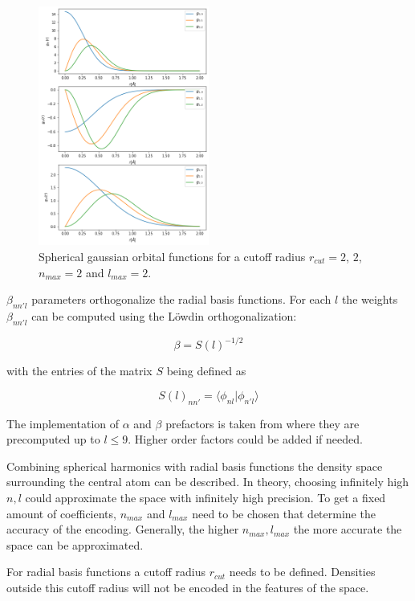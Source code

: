 \begin{figure} [hb!]
  \centering
  \includegraphics[width=0.5\textwidth]{figures/snap/gaus_orb.png} %
  \caption[Radial basis functions]{Spherical gaussian orbital functions for a cutoff radius $r_{cut}=2$, $2$, $n_{max}=2$ and $l_{max}=2$. }
  \label{fig:gaussians}
\end{figure}

$\beta_{nn'l}$ parameters orthogonalize the radial basis functions.
For each $l$ the weights $\beta_{nn'l}$ can be computed using the Löwdin orthogonalization:

$$\beta = S(l)^{-1/2} $$

with the entries of the matrix $S$ being defined as

$$S(l)_{nn'} = \langle \phi_{nl} | \phi_{n'l} \rangle  $$

The implementation of $\alpha$ and $\beta$ prefactors is taken from \cite{dscribe} where they are precomputed up to $l \leq 9$.
Higher order factors could be added if needed.


Combining spherical harmonics with radial basis functions the density space surrounding the central atom can be described.
In theory, choosing infinitely high $n, l$ could approximate the space with infinitely high precision.
To get a fixed amount of coefficients, $n_{max}$ and $l_{max}$ need to be chosen that determine the
accuracy of the encoding.
Generally, the higher $n_{max}, l_{max}$ the more accurate the space can be approximated.

For radial basis functions a cutoff radius $r_{cut}$ needs to be defined.
Densities outside this cutoff radius will not be encoded in the features of the space.

